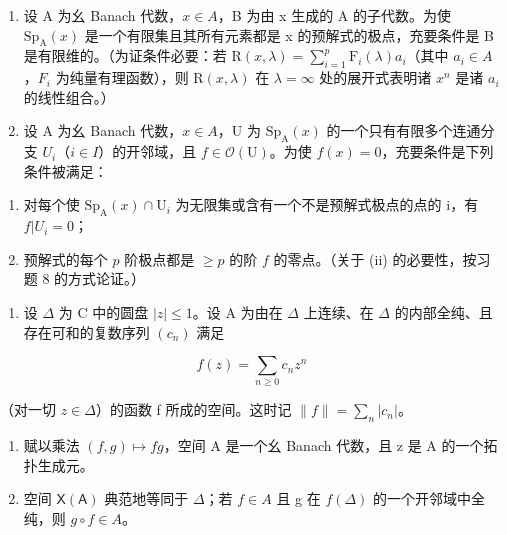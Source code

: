 \begin{enumerate}
\def\labelenumi{\arabic{enumi})}
\setcounter{enumi}{7}
\item
  设 A 为幺 Banach 代数，\(x \in A\)，B 为由 x 生成的 A 的子代数。为使 \(\mathrm{Sp}_{\mathrm{A}}(x)\) 是一个有限集且其所有元素都是 x 的预解式的极点，充要条件是 B 是有限维的。（为证条件必要：若 \(\mathrm{R}(x, \lambda) = \sum_{i=1}^{p} \mathrm{F}_{i}(\lambda) a_{i}\)（其中 \(a_{i} \in A\)，\(F_{i}\) 为纯量有理函数），则 \(\mathrm{R}(x, \lambda)\) 在 \(\lambda = \infty\) 处的展开式表明诸 \(x^{n}\) 是诸 \(a_{i}\) 的线性组合。）
\item
  设 A 为幺 Banach 代数，\(x \in A\)，U 为 \(\mathrm{Sp}_{\mathrm{A}}(x)\) 的一个只有有限多个连通分支 \(U_{i}\)（\(i \in I\)）的开邻域，且 \(f \in \mathcal{O}(\mathrm{U})\)。为使 \(f(x) = 0\)，充要条件是下列条件被满足：
\end{enumerate}

\begin{enumerate}
\def\labelenumi{(\roman{enumi})}
\item
  对每个使 \(\mathrm{Sp}_{\mathrm{A}}(x)\cap\mathrm{U}_{i}\) 为无限集或含有一个不是预解式极点的点的 i，有 \(f|U_{i}=0\)；
\item
  预解式的每个 \(p\) 阶极点都是 \(\geqslant p\) 的阶 \(f\) 的零点。（关于 (ii) 的必要性，按习题 8 的方式论证。）
\end{enumerate}

\begin{enumerate}
\def\labelenumi{\arabic{enumi})}
\setcounter{enumi}{9}
\tightlist
\item
  设 \(\Delta\) 为 C 中的圆盘 \(|z| \leqslant 1\)。设 A 为由在 \(\Delta\) 上连续、在 \(\Delta\) 的内部全纯、且存在可和的复数序列 \((c_{n})\) 满足
\end{enumerate}

\[
f (z) = \sum_ {n \geqslant 0} c _ {n} z ^ {n}
\]

（对一切 \(z \in \Delta\)）的函数 f 所成的空间。这时记 \(\|f\| = \sum_{n}|c_{n}|\)。

\begin{enumerate}
\def\labelenumi{\alph{enumi})}
\item
  赋以乘法 \((f,g)\mapsto fg\)，空间 A 是一个幺 Banach 代数，且 z 是 A 的一个拓扑生成元。
\item
  空间 \(\mathsf{X}(\mathsf{A})\) 典范地等同于 \(\Delta\)；若 \(f \in A\) 且 g 在 \(f(\Delta)\) 的一个开邻域中全纯，则 \(g \circ f \in A\)。
\end{enumerate}

